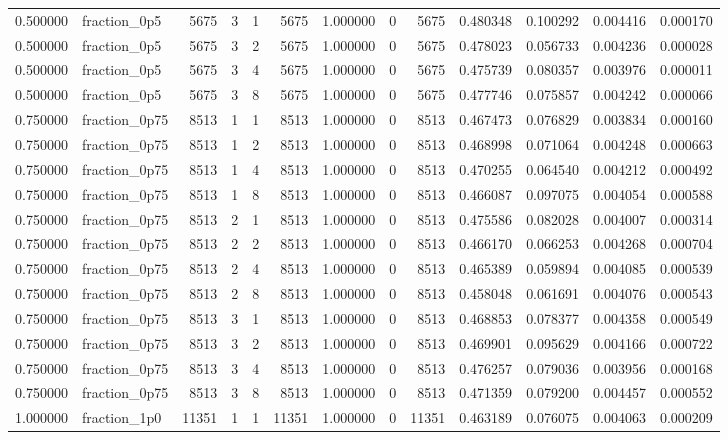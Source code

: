 \begin{tabular}{rlrrrrrrrrrrr}
0.500000 & fraction\_0p5 & 5675 & 3 & 1 & 5675 & 1.000000 & 0 & 5675 & 0.480348 & 0.100292 & 0.004416 & 0.000170 \\
0.500000 & fraction\_0p5 & 5675 & 3 & 2 & 5675 & 1.000000 & 0 & 5675 & 0.478023 & 0.056733 & 0.004236 & 0.000028 \\
0.500000 & fraction\_0p5 & 5675 & 3 & 4 & 5675 & 1.000000 & 0 & 5675 & 0.475739 & 0.080357 & 0.003976 & 0.000011 \\
0.500000 & fraction\_0p5 & 5675 & 3 & 8 & 5675 & 1.000000 & 0 & 5675 & 0.477746 & 0.075857 & 0.004242 & 0.000066 \\
0.750000 & fraction\_0p75 & 8513 & 1 & 1 & 8513 & 1.000000 & 0 & 8513 & 0.467473 & 0.076829 & 0.003834 & 0.000160 \\
0.750000 & fraction\_0p75 & 8513 & 1 & 2 & 8513 & 1.000000 & 0 & 8513 & 0.468998 & 0.071064 & 0.004248 & 0.000663 \\
0.750000 & fraction\_0p75 & 8513 & 1 & 4 & 8513 & 1.000000 & 0 & 8513 & 0.470255 & 0.064540 & 0.004212 & 0.000492 \\
0.750000 & fraction\_0p75 & 8513 & 1 & 8 & 8513 & 1.000000 & 0 & 8513 & 0.466087 & 0.097075 & 0.004054 & 0.000588 \\
0.750000 & fraction\_0p75 & 8513 & 2 & 1 & 8513 & 1.000000 & 0 & 8513 & 0.475586 & 0.082028 & 0.004007 & 0.000314 \\
0.750000 & fraction\_0p75 & 8513 & 2 & 2 & 8513 & 1.000000 & 0 & 8513 & 0.466170 & 0.066253 & 0.004268 & 0.000704 \\
0.750000 & fraction\_0p75 & 8513 & 2 & 4 & 8513 & 1.000000 & 0 & 8513 & 0.465389 & 0.059894 & 0.004085 & 0.000539 \\
0.750000 & fraction\_0p75 & 8513 & 2 & 8 & 8513 & 1.000000 & 0 & 8513 & 0.458048 & 0.061691 & 0.004076 & 0.000543 \\
0.750000 & fraction\_0p75 & 8513 & 3 & 1 & 8513 & 1.000000 & 0 & 8513 & 0.468853 & 0.078377 & 0.004358 & 0.000549 \\
0.750000 & fraction\_0p75 & 8513 & 3 & 2 & 8513 & 1.000000 & 0 & 8513 & 0.469901 & 0.095629 & 0.004166 & 0.000722 \\
0.750000 & fraction\_0p75 & 8513 & 3 & 4 & 8513 & 1.000000 & 0 & 8513 & 0.476257 & 0.079036 & 0.003956 & 0.000168 \\
0.750000 & fraction\_0p75 & 8513 & 3 & 8 & 8513 & 1.000000 & 0 & 8513 & 0.471359 & 0.079200 & 0.004457 & 0.000552 \\
1.000000 & fraction\_1p0 & 11351 & 1 & 1 & 11351 & 1.000000 & 0 & 11351 & 0.463189 & 0.076075 & 0.004063 & 0.000209 \\

\end{tabular}
